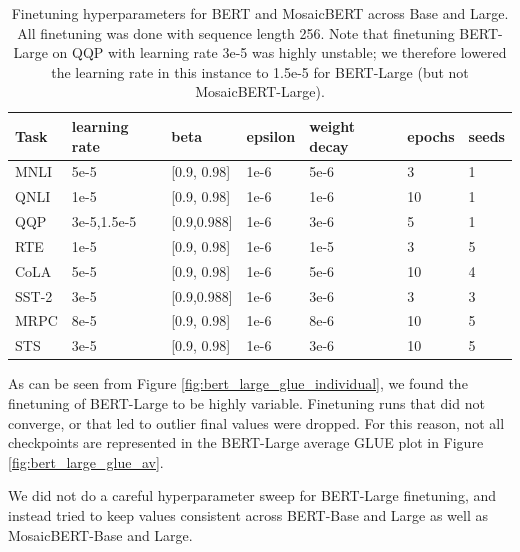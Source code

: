 \begin{table}[!ht]
\begin{tabular}{p{1.5cm} p{2cm} p{2.0cm} p{1.5cm} p{} p{1.0cm} p{1.0cm} }
\toprule
Task & learning rate & beta & epsilon & weight decay & epochs & seeds \\ \hline
MNLI & 5e-5 & [0.9, 0.98] & 1e-6 & 5e-6 & 3 & 1 \\
QNLI & 1e-5 & [0.9, 0.98] & 1e-6 & 1e-6 & 10 & 1 \\
QQP & 3e-5,1.5e-5 & [0.9,0.988] & 1e-6 & 3e-6 & 5 & 1\\
RTE & 1e-5 & [0.9, 0.98] & 1e-6 & 1e-5 & 3 & 5\\
CoLA & 5e-5 & [0.9, 0.98] & 1e-6 & 5e-6 & 10 & 4 \\
SST-2 & 3e-5 & [0.9,0.988] & 1e-6 & 3e-6 & 3 & 3 \\
MRPC & 8e-5 & [0.9, 0.98] & 1e-6 & 8e-6 & 10 & 5 \\ 
STS & 3e-5 & [0.9, 0.98] & 1e-6& 3e-6 & 10 & 5 \\
\bottomrule
\end{tabular}
\caption{Finetuning hyperparameters for BERT and MosaicBERT across Base and Large. All finetuning was done with sequence length 256. Note that finetuning BERT-Large on QQP with learning rate 3e-5 was highly unstable; we therefore lowered the learning rate in this instance to 1.5e-5 for BERT-Large (but not MosaicBERT-Large).}
\label{tab:finetuning_hyperparameters}
\end{table}

As can be seen from Figure \ref{fig:bert_large_glue_individual}, we found the finetuning of BERT-Large to be highly variable. Finetuning runs that did not converge, or that led to outlier final values were dropped. For this reason, not all checkpoints are represented in the BERT-Large average GLUE plot in Figure \ref{fig:bert_large_glue_av}.

We did not do a careful hyperparameter sweep for BERT-Large finetuning, and instead tried to keep values consistent across BERT-Base and Large as well as MosaicBERT-Base and Large.

